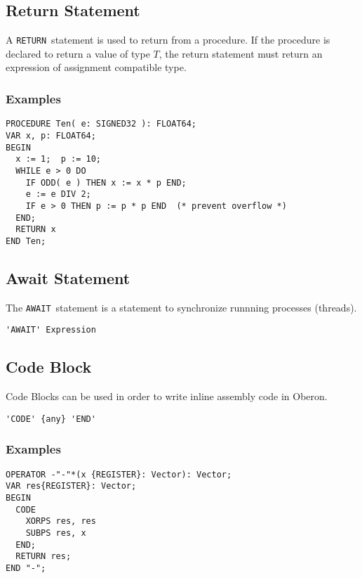 \documentclass[a4wide,11pt]{article}
\newcommand{\RETURN}{\lstinline"RETURN"}
\newcommand{\AWAIT}{\lstinline"AWAIT"}
\begin{document}
\subsection{Return Statement}
A \RETURN\ statement is used to return from a procedure.
If the procedure is declared to return a value of type $T$, the return statement must return an expression of assignment compatible type.

\begin{annotation}
\subsubsection{Examples}
\begin{lstlisting}[style=example]
PROCEDURE Ten( e: SIGNED32 ): FLOAT64;
VAR x, p: FLOAT64;
BEGIN
  x := 1;  p := 10;
  WHILE e > 0 DO
    IF ODD( e ) THEN x := x * p END;
    e := e DIV 2;
    IF e > 0 THEN p := p * p END  (* prevent overflow *)
  END;
  RETURN x
END Ten;
\end{lstlisting}
\end{annotation}


\subsection{Await Statement}
The \AWAIT\ statement is a statement to synchronize runnning processes (threads).

\begin{lstlisting}[style=ebnf]
'AWAIT' Expression
\end{lstlisting}


\subsection{Code Block}
Code Blocks can be used in order to write inline assembly code in Oberon.
\begin{lstlisting}[style=ebnf]
'CODE' {any} 'END'
\end{lstlisting}

\begin{annotation}
\subsubsection{Examples}
\begin{lstlisting}[style=example]
OPERATOR -"-"*(x {REGISTER}: Vector): Vector;
VAR res{REGISTER}: Vector;
BEGIN
  CODE
    XORPS res, res
    SUBPS res, x
  END;
  RETURN res;
END "-";
\end{lstlisting}
\end{annotation}
\end{document}
